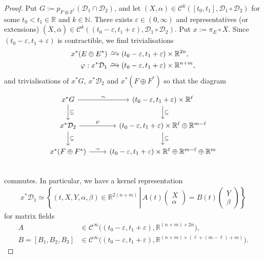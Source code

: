 \documentclass[10pt,a4paper]{amsart}
\newcommand{\set}[1]{\left\lbrace #1\right\rbrace}
\newcommand{\simto}{\xrightarrow{\raisebox{-0.7ex}[0ex][0ex]{$\sim$}}} %
\begin{document}
\begin{proof}
Put $G:=p_{F\oplus F^*}\left(\mathcal{D}_1\cap\mathcal{D}_2\right)$, and let $(X,\alpha)\in \mathcal{C}^k([t_0,t_1],\mathcal{D}_1\circ\mathcal{D}_2)$ for some $t_0<t_1\in\mathbb{R}$ and $k\in\mathbb{N}$. There exists $\varepsilon\in (0,\infty)$ and representatives (or extensions) $(\overline{X},\overline{\alpha})\in\mathcal{C}^k((t_0-\varepsilon,t_1+\varepsilon),\mathcal{D}_1\circ\mathcal{D}_2)$. Put $x := \pi_E\circ \overline{X}$. Since $(t_0-\varepsilon,t_1+\varepsilon)$ is contractible, we find trivialisations
\begin{align*}
x^*(E\oplus E^*) & \simto (t_0-\varepsilon,t_1+\varepsilon)\times\mathbb{R}^{2n},\\
\varphi:x^*\mathcal{D}_1 & \simto (t_0-\varepsilon,t_1+\varepsilon)\times\mathbb{R}^{n+m},
\end{align*}
and trivialisations of $x^*G$, $x^*\mathcal{D}_2$ and $x^*(F\oplus F^*)$ so that the diagram
\begin{equation}\label{eq:comm_diagram}
\begin{tikzcd}
x^*G \arrow[d,"\subseteq"]\arrow[r,"\sim"] & (t_0-\varepsilon,t_1+\varepsilon)\times\mathbb{R}^\ell\arrow[d,"\subseteq"]\\
x^*\mathcal{D}_2\arrow[r,"\psi"]\arrow[d,"\subseteq"] & (t_0-\varepsilon,t_1+\varepsilon)\times\mathbb{R}^\ell\oplus\mathbb{R}^{m-\ell}\arrow[d,"\subseteq"]\\ 
x^*(F\oplus F^*)\arrow[r,"\sim"] & (t_0-\varepsilon,t_1+\varepsilon)\times\mathbb{R}^\ell\oplus\mathbb{R}^{m-\ell}\oplus\mathbb{R}^{m}\\ 
\end{tikzcd}
\end{equation}
commutes. In particular, we have a kernel representation
\begin{align*}
x^*\mathcal{D}_1 \simeq \set{(t,X,Y,\alpha,\beta)\in\mathbb{R}^{2(n+m)}\,\left\vert\, A(t)\begin{pmatrix}
X\\\alpha
\end{pmatrix} = B(t)\begin{pmatrix}
Y\\\beta
\end{pmatrix}\right.}
\end{align*}
for matrix fields
\begin{align*}
A & \in\mathcal{C}^\infty\big((t_0-\varepsilon,t_1+\varepsilon),\mathbb{R}^{(n+m)\times 2n}\big),\\
B = [B_1, B_2, B_3] & \in\mathcal{C}^\infty\big((t_0-\varepsilon,t_1+\varepsilon),\mathbb{R}^{(n+m)\times (\ell+(m-\ell)+m)}\big).

\end{align*}
\end{proof}
\end{document}
